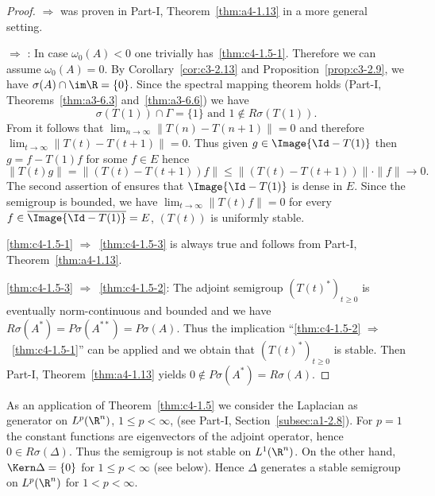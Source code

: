 \begin{proof}
 $\Rightarrow$  was proven in Part-I, Theorem~\ref{thm:a4-1.13} in a more general setting.

 $\Rightarrow$ :  In case $\omega_{0}(A) < 0$ one trivially has~\ref{thm:c4-1.5-1}.
Therefore we can assume $\omega_{0}(A) = 0$.
By Corollary~\ref{cor:c3-2.13} and Proposition~\ref{prop:c3-2.9},  we have $\sigma(A) \cap \im\R = \{0\}$.
Since the spectral mapping theorem holds 
(\cf Part-I, Theorems~\ref{thm:a3-6.3} and~\ref{thm:a3-6.6}) we have
\begin{equation}\label{eq:c4-1.5}
\sigma(T(1)) \cap \Gamma = \{1\} \text{ and } 1 \notin R{\sigma}(T(1)).
\end{equation}
From  it follows that $\lim_{n \to \infty} \|T(n) - T(n+1)\| = 0$ and therefore $\lim_{t \to \infty} \|T(t) - T(t+1)\| = 0$.
Thus given $g \in \Image{\Id - T(1)}$ then $g = f - T(1)f$ for some $f \in E$ hence 
\[
\|T(t)g\| = \|(T(t) - T(t+1))f\| \leq \|(T(t) - T(t+1))\| \cdot \|f\| \to 0.
\]
The second assertion of  ensures that $\Image{\Id - T(1)}$ is dense in $E$.
Since the semigroup is bounded, we have $\lim_{t \to \infty} \|T(t)f\| = 0$ for every $f \in \overline{\Image{\Id - T(1)}} = E$, \ie  $(T(t))$ is uniformly stable.

\ref{thm:c4-1.5-1} $\Rightarrow$~\ref{thm:c4-1.5-3} is always true and follows from Part-I, Theorem~\ref{thm:a4-1.13}.

\ref{thm:c4-1.5-3} $\Rightarrow$~\ref{thm:c4-1.5-2}:  
The adjoint semigroup $(T(t)^*)_{t \geq 0}$ is eventually norm-continuous and boun\-ded and we have $R{\sigma}(A^*) = P{\sigma}(A^{**}) = P{\sigma}(A)$.
Thus the implication \enquote{\ref{thm:c4-1.5-2} $\Rightarrow$~\ref{thm:c4-1.5-1}} can be applied and we obtain that $(T(t)^*)_{t \geq 0}$ is stable.
Then Part-I, Theorem~\ref{thm:a4-1.13} yields $0 \notin P{\sigma}(A^*) = R{\sigma}(A)$.
\end{proof}
As an application of Theorem~\ref{thm:c4-1.5}  we consider the Laplacian as generator on $L^{p}(\R^{n})$, $1 \leq p < \infty$, (see Part-I, Section~\ref{subsec:a1-2.8}).
For $p = 1$ the constant functions are eigenvectors of the adjoint operator, hence $0 \in R{\sigma}(\Delta)$.
Thus the semigroup is not stable on $L^{1}(\R^{n})$.
On the other hand, $\Kern\Delta =\{ 0 \}$ for $ 1 \leq p < \infty$ (see below). 
Hence $\Delta$ generates a stable semigroup on $L^{p}(\R^{n})$ for $1 < p < \infty$.

